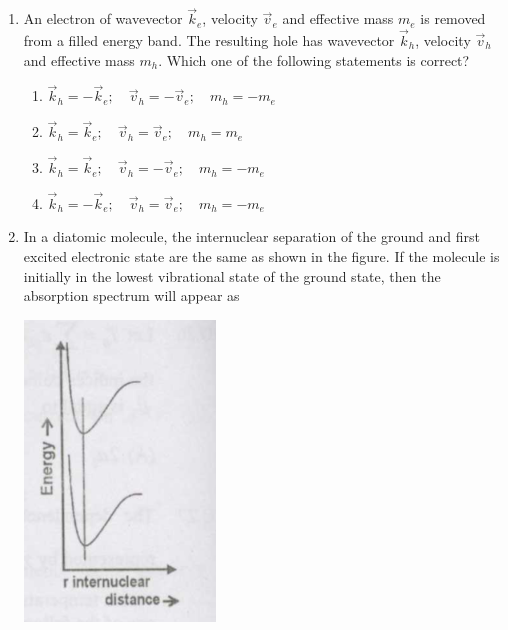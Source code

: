 \documentclass[14pt, a4paper]{extarticle}
\begin{document}
\begin{enumerate}[label=\textbf{Q. \arabic*}, start=21]
\item An electron of wavevector $\vec{k}_e$, velocity $\vec{v}_e$ and effective mass $m_e$ is removed from a filled energy band. The resulting hole has wavevector $\vec{k}_h$, velocity $\vec{v}_h$ and effective mass $m_h$. Which one of the following statements is correct?
\begin{enumerate}[label=(\Alph*)]
\item $\vec{k}_h = -\vec{k}_e; \quad \vec{v}_h = -\vec{v}_e; \quad m_h = -m_e$
\item $\vec{k}_h = \vec{k}_e; \quad \vec{v}_h = \vec{v}_e; \quad m_h = m_e$
\item $\vec{k}_h = \vec{k}_e; \quad \vec{v}_h = -\vec{v}_e; \quad m_h = -m_e$
\item $\vec{k}_h = -\vec{k}_e; \quad \vec{v}_h = \vec{v}_e; \quad m_h = -m_e$
\end{enumerate}

\item In a diatomic molecule, the internuclear separation of the ground and first excited electronic state are the same as shown in the figure. If the molecule is initially in the lowest vibrational state of the ground state, then the absorption spectrum will appear as
    \begin{center}
        \includegraphics[width=0.4\textwidth]{figs/Q30fig1.png}
    \end{center}
    \begin{enumerate}[label=(\Alph*)]
\end{enumerate}
\end{enumerate}
\end{document}
